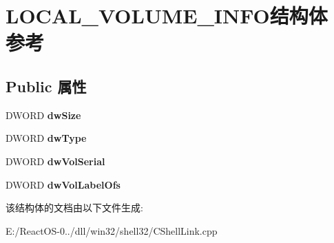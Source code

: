 \hypertarget{struct_l_o_c_a_l___v_o_l_u_m_e___i_n_f_o}{}\section{L\+O\+C\+A\+L\+\_\+\+V\+O\+L\+U\+M\+E\+\_\+\+I\+N\+F\+O结构体 参考}
\label{struct_l_o_c_a_l___v_o_l_u_m_e___i_n_f_o}
\subsection*{Public 属性}
\begin{DoxyCompactItemize}
\item 
\mbox{\label{struct_l_o_c_a_l___v_o_l_u_m_e___i_n_f_o_a4a077830035a30813b1feba4d66a99ed}} 
D\+W\+O\+RD {\bfseries dw\+Size}
\item 
\mbox{\label{struct_l_o_c_a_l___v_o_l_u_m_e___i_n_f_o_af43cff57c96c9805a181bfea3629ec28}} 
D\+W\+O\+RD {\bfseries dw\+Type}
\item 
\mbox{\label{struct_l_o_c_a_l___v_o_l_u_m_e___i_n_f_o_a5af40385748912f33db1324b6afa8e6f}} 
D\+W\+O\+RD {\bfseries dw\+Vol\+Serial}
\item 
\mbox{\label{struct_l_o_c_a_l___v_o_l_u_m_e___i_n_f_o_a10489a7aba9fe4590cb8796412b371a8}} 
D\+W\+O\+RD {\bfseries dw\+Vol\+Label\+Ofs}
\end{DoxyCompactItemize}


该结构体的文档由以下文件生成\+:\begin{DoxyCompactItemize}
\item 
E\+:/\+React\+O\+S-\/0../dll/win32/shell32/C\+Shell\+Link.\+cpp\end{DoxyCompactItemize}
